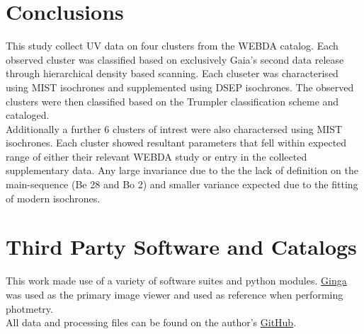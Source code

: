\section{Conclusions}

This study collect UV data on four clusters from the WEBDA catalog. Each observed cluster was classified based on exclusively Gaia's second data release through hierarchical density based scanning. Each cluseter was characterised using MIST isochrones and supplemented using DSEP isochrones. The observed clusters were then classified based on the Trumpler classification scheme and cataloged. \\ 
Additionally a further 6 clusters of intrest were also charactersed using MIST isochrones. Each cluster showed resultant parameters that fell within expected range of either their relevant WEBDA study or entry in the collected supplementary data. Any large invariance due to the the lack of definition on the main-sequence (Be 28 and Bo 2) and smaller variance expected due to the fitting of modern isochrones.

\section{Third Party Software and Catalogs} \label{sec:cite}

This work made use of a variety of software suites and python modules. \href{https://github.com/ejeschke/ginga}{Ginga} was used as the primary image viewer and used as reference when performing photmetry.  \\ All data and processing files can be found on the author's \href{https://github.com/OwenJohnsons/Open-Clusters-Project}{GitHub}.